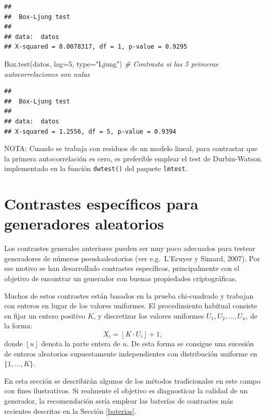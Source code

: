 \documentclass[
]{book}
\newenvironment{Shaded}{\begin{snugshade}}{\end{snugshade}}
\newcommand{\AttributeTok}[1]{\textcolor[rgb]{0.77,0.63,0.00}{#1}}
\newcommand{\CommentTok}[1]{\textcolor[rgb]{0.56,0.35,0.01}{\textit{#1}}}
\newcommand{\DecValTok}[1]{\textcolor[rgb]{0.00,0.00,0.81}{#1}}
\newcommand{\FunctionTok}[1]{\textcolor[rgb]{0.00,0.00,0.00}{#1}}
\newcommand{\NormalTok}[1]{#1}
\newcommand{\StringTok}[1]{\textcolor[rgb]{0.31,0.60,0.02}{#1}}
\theoremstyle{break}
\theoremstyle{nonumberplain}
\begin{document}
\begin{verbatim}
## 
##  Box-Ljung test
## 
## data:  datos
## X-squared = 0.0078317, df = 1, p-value = 0.9295
\end{verbatim}

\begin{Shaded}
\begin{Highlighting}[]
\FunctionTok{Box.test}\NormalTok{(datos, }\AttributeTok{lag=}\DecValTok{5}\NormalTok{, }\AttributeTok{type=}\StringTok{"Ljung"}\NormalTok{) }\CommentTok{\# Contrasta si las 5 primeras autocorrelaciones son nulas}
\end{Highlighting}
\end{Shaded}

\begin{verbatim}
## 
##  Box-Ljung test
## 
## data:  datos
## X-squared = 1.2556, df = 5, p-value = 0.9394
\end{verbatim}

NOTA: Cuando se trabaja con residuos de un modelo lineal, para contrastar que la primera autocorrelación es cero, es preferible emplear el test de
Durbin-Watson implementado en la función \texttt{dwtest()} del paquete \texttt{lmtest}.

\hypertarget{contrastes-especuxedficos-para-generadores-aleatorios}{%
\section{Contrastes específicos para generadores aleatorios}\label{contrastes-especuxedficos-para-generadores-aleatorios}}

Los contrastes generales anteriores pueden ser muy poco adecuados para testear generadores de números pseudoaleatorios (ver e.g.~L'Ecuyer y Simard, 2007). Por ese motivo se han desarrollado contrastes específicos, principalmente con el objetivo de encontrar un generador con buenas propiedades criptográficas.

Muchos de estos contrastes están basados en la prueba chi-cuadrado y trabajan con enteros en lugar de los valores uniformes. El procedimiento habitual consiste en fijar un entero positivo \(K\), y discretizar los valores uniformes \(U_{1},U_{2},\ldots,U_{n}\), de la forma:
\[X_i = \left\lfloor K\cdot U_{i}\right\rfloor + 1 ,\]
donde \(\left\lfloor u\right\rfloor\) denota la parte entera de \(u\).
De esta forma se consigue una sucesión de enteros aleatorios supuestamente independientes con distribución uniforme en \(\{1, \ldots, K\}\).

En esta sección se describirán algunos de los métodos tradicionales en este campo con fines ilustrativos. Si realmente el objetivo es diagnosticar la calidad de un generador, la recomendación sería emplear las baterías de contrastes más recientes descritas en la Sección \ref{baterias}.
\end{document}
